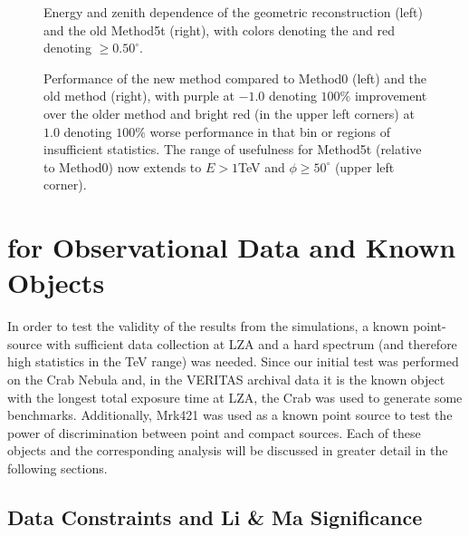 \documentclass[main.tex]{subfiles}
\begin{document}
\begin{figure}[htbp]
  \centering
  \caption[Energy and zenith dependence of Method0 and the old Method5t]{Energy and zenith dependence of the geometric reconstruction (left) and the old Method5t (right), with colors denoting the \rse and red denoting \rse$\geq0.50^\circ$.}
  \label{fig:energy_contour}
\end{figure}

\begin{figure}[htbp]
  \centering
  \caption[Performance of the new \disp method compared to Method0 and the old \disp method]{Performance of the new \disp method compared to Method0 (left) and the old \disp method (right), with purple at $-1.0$ denoting $100\%$ improvement over the older method and bright red (in the upper left corners) at $1.0$ denoting $100\%$ worse performance in that bin or regions of insufficient statistics. The range of usefulness for Method5t (relative to Method0) now extends to $E>1$TeV and $\phi\geq50^\circ$ (upper left corner).}
  \label{fig:energy_rel}
\end{figure}

\section{\rse for Observational Data and Known Objects}
In order to test the validity of the results from the simulations, a known point-source with sufficient data collection at LZA and a hard spectrum (and therefore high statistics in the TeV range) was needed. Since our initial test was performed on the Crab Nebula and, in the VERITAS archival data it is the known object with the longest total exposure time at LZA, the Crab was used to generate some benchmarks. Additionally, Mrk421 was used as a known point source to test the power of discrimination between point and compact sources. Each of these objects and the corresponding analysis will be discussed in greater detail in the following sections.

\subsection{Data Constraints and Li \& Ma Significance}
\end{document}
